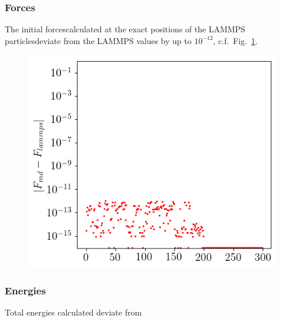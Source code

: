 \documentclass[a4paper, twocolumn]{article}
\newcommand{\fig}[1]{Fig.\ \ref{fig:#1}}
\begin{document}
\subsubsection*{Forces}
The initial forces\textemdash calculated at the exact positions of the LAMMPS particles\textemdash deviate from the LAMMPS values by up to $10^{-12}$, c.f.\ \fig{3}.

\begin{figure}
\centering
\includegraphics[width=0.8\linewidth]{forces-firststep.png}
\caption{\label{fig:3}}
\end{figure}



\subsubsection*{Energies}
Total energies calculated deviate from 
\end{document}
